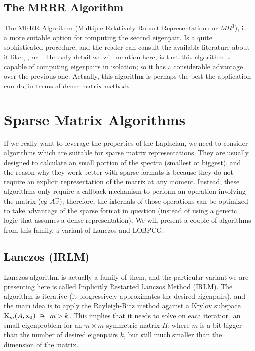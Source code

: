 \subsection{The \gls{MRRR} Algorithm}

The \gls{MRRR} Algorithm (Multiple Relatively Robust Representations or
$MR^3$), is a more suitable option for computing the second
eigenpair. Is a quite sophisticated procedure, and the reader
can consult the available literature about it like \cite{dhillon97},
\cite{dhillon04}, \cite{dhillon06} or \cite{parlett04}. The only
detail we will mention here, is that this algorithm is capable of
computing eigenpairs in isolation; so it has a considerable advantage
over the previous one. Actually, this algorithm is perhaps the best
the application can do, in terms of dense matrix methods.


\section{Sparse Matrix Algorithms}

If we really want to leverage the properties of the \gls{Laplacian}, we need
to consider algorithms which are suitable for sparse matrix
representations. They are usually designed to calculate an small
portion of the spectra (smallest or biggest), and the reason why they
work better with sparse formats is because they do not require
an explicit representation of the matrix at any moment. Instead, these
algorithms only require a callback mechanism to perform an operation
involving the matrix (eg $A\vec{x}$); therefore, the internals of
those operations can be optimized to take advantage of the sparse
format in question (instead of using a generic logic that assumes a
dense representation). We will present a couple of algorithms from
this family, a variant of Lanczos and LOBPCG.

\subsection{Lanczos (\gls{IRLM})}
\label{sub:irlm}

Lanczos algorithm is actually a family of them, and the particular
variant we are presenting here is called Implicitly Restarted Lanczos
Method (\gls{IRLM}). The algorithm is iterative (it progressively approximates the
desired eigenpairs), and the main idea is to apply the Rayleigh-Ritz
method against a Krylov subspace $\Krylov{A}{\vec{x_0}}{m} \suchthat m
> k$. This implies that it needs to solve on each iteration, an small
eigenproblem for an $m \times m$ symmetric matrix $H$; where $m$ is a bit bigger
than the number of desired eigenpairs $k$, but still much smaller than the
dimension of the matrix. \\

